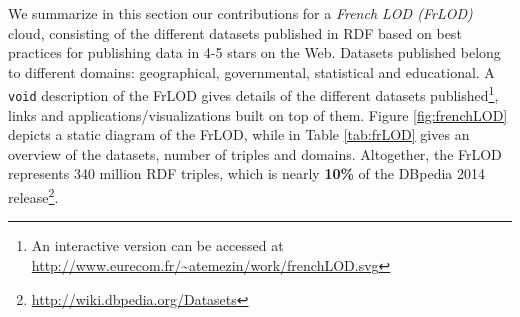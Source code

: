 We summarize in this section our contributions for a \textit{French LOD (FrLOD)} cloud, consisting of the different datasets published in RDF based on best practices for publishing data in 4-5 stars on the Web. Datasets published belong to different domains: geographical, governmental, statistical and educational. A \texttt{void} description of the FrLOD gives details of the different datasets published\footnote{An interactive version can be accessed at \url{http://www.eurecom.fr/~atemezin/work/frenchLOD.svg}}, links and applications/visualizations built on top of them. Figure  \ref{fig:frenchLOD} depicts a static diagram of the FrLOD, while in Table \ref{tab:frLOD} gives an overview of the datasets, number of triples and domains. Altogether, the FrLOD represents 340 million RDF triples, which is nearly \textbf{10\%} of the DBpedia 2014 release\footnote{\url{http://wiki.dbpedia.org/Datasets}}.

\begin{figure}[h!tb]
\end{figure}

